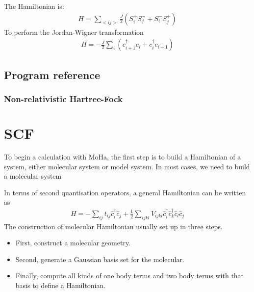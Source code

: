 \documentclass[letterpaper,10pt,english]{sphinxmanual}
\begin{document}
The Hamiltonian is:
\begin{equation*}
\begin{split}H=\sum_{<ij>}\frac{J}{2}\left(S^{+}_{i}S^{-}_{j}+S^{-}_{i}S^{+}_{j}\right)\end{split}
\end{equation*}
To perform the Jordan-Wigner transformation
\begin{equation*}
\begin{split}H=-\frac{J}{2}\sum_{i}\left(c^{\dagger}_{i+1}c_{i}+c^{\dagger}_{i}c_{i+1}\right)\end{split}
\end{equation*}

\subsection{Program reference}
\label{\detokenize{user_model_system:module-moha.modelsystem}}\label{\detokenize{user_model_system:program-reference}}

\subsubsection{Non-relativistic Hartree-Fock}
\label{\detokenize{user_model_system:non-relativistic-hartree-fock}}

\section{SCF}
\label{\detokenize{posthf:scf}}\label{\detokenize{posthf::doc}}
To begin a calculation with MoHa, the first step is to build a Hamiltonian of a
system, either molecular system or model system. In most cases, we need to build a molecular
system

In terms of second quantisation operators, a general Hamiltonian can be written
as
\begin{equation*}
\begin{split}H = - \sum_{ij} t_{ij}\hat{c}^{\dagger}_{i}\hat{c}_{j} + \frac{1}{2} \sum_{ijkl}
V_{ijkl}\hat{c}^{\dagger}_{i}\hat{c}^{\dagger}_{k}\hat{c}_{l}\hat{c}_{j}\end{split}
\end{equation*}
The construction of molecular Hamiltonian usually set up in three steps.
\begin{itemize}
\item {} 
First, construct a molecular geometry.

\item {} 
Second, generate a Gaussian basis set for the molecular.

\item {} 
Finally, compute all kinds of one body terms and two body terms with that basis
to define a Hamiltonian.

\end{itemize}
\end{document}
